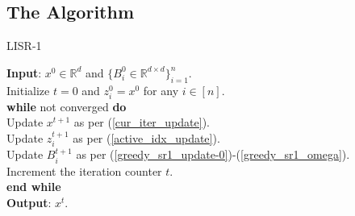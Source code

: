 \documentclass[letterpaper]{article} %
\theoremstyle{plain}
\theoremstyle{definition}
\theoremstyle{remark}
\def\BR{{\mathbb{R}}}
\begin{document}

\subsection{The Algorithm}

\begin{algorithm}[tb]
\caption{LISR-1}\label{alg:iqn_algos}
\begin{algorithmic}[1] %
\STATE \textbf{Input}: $x^0\in\BR^d$ and $\{B_i^0\in\BR^{d\times d}\}_{i=1}^n$.\\[0.1cm]
\STATE Initialize $t=0$ and $z_i^0 = x^0$ for any $i \in [n]$. \\[0.1cm]
\STATE \textbf{while} not converged \textbf{do} \\[0.1cm]
\STATE \quad Update $x^{t+1}$ as per (\ref{cur_iter_update}). \\[0.1cm]
\STATE \quad Update $z_{i}^{t+1}$ as per (\ref{active_idx_update}). \\[0.1cm]
\STATE \quad Update $B_{i}^{t+1}$ as per (\ref{greedy_sr1_update-0})-(\ref{greedy_sr1_omega}). \\[0.1cm]
\STATE \quad Increment the iteration counter $t$. \\[0.1cm]
\STATE \textbf{end while} \\[0.1cm]
\STATE \textbf{Output}:  $x^t$.
\end{algorithmic}
\end{algorithm}
\end{document}
